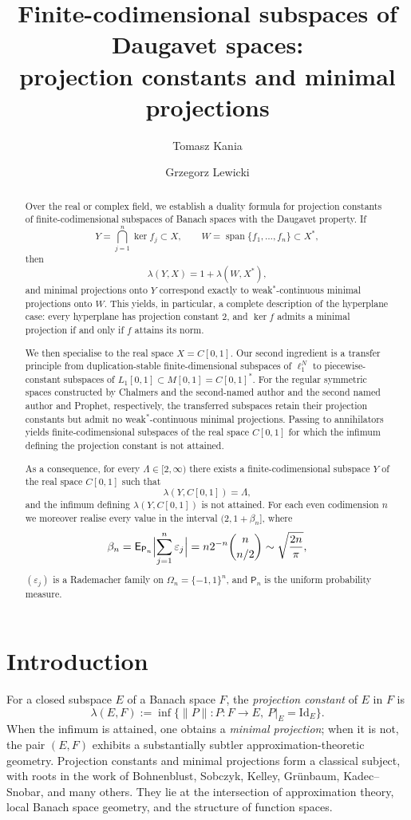 \documentclass[11pt]{amsart}
\title[Finite-codimensional subspaces of Daugavet spaces]
{Finite-codimensional subspaces of Daugavet spaces:\\
projection constants and minimal projections}
\author[T.~Kania]{Tomasz Kania}
\author[G.~Lewicki]{Grzegorz Lewicki}
\numberwithin{equation}{section}
\theoremstyle{definition}
\theoremstyle{remark}
\newcommand{\Id}{\mathrm{Id}}
\newcommand{\Exp}{\mathsf E}
\newcommand{\Prob}{\mathsf P}
\DeclareMathOperator{\spanop}{span}
\begin{document}
\begin{abstract}
Over the real or complex field, we establish a duality formula for projection constants of finite-codimensional subspaces of Banach spaces with the Daugavet property. If
\[
Y=\bigcap_{j=1}^n \ker f_j \subset X,
\qquad
W=\spanop\{f_1,\dots,f_n\} \subset X^*,
\]
then
\[
\lambda(Y,X)=1+\lambda(W,X^*),
\]
and minimal projections onto $Y$ correspond exactly to weak$^*$-continuous minimal projections onto $W$. This yields, in particular, a complete description of the hyperplane case: every hyperplane has projection constant $2$, and $\ker f$ admits a minimal projection if and only if $f$ attains its norm.

We then specialise to the real space $X=C[0,1]$. Our second ingredient is a transfer principle from duplication-stable finite-dimensional subspaces of $\ell_1^N$ to piecewise-constant subspaces of $L_1[0,1]\subset M[0,1]=C[0,1]^*$. For the regular symmetric spaces constructed by Chalmers and the second-named author and the second named author and Prophet, respectively, the transferred subspaces retain their projection constants but admit no weak$^*$-continuous minimal projections. Passing to annihilators yields finite-codimensional subspaces of the real space $C[0,1]$ for which the infimum defining the projection constant is not attained.

As a consequence, for every $\Lambda\in[2,\infty)$ there exists a finite-codimensional subspace $Y$ of the real space $C[0,1]$ such that
\[
\lambda(Y,C[0,1])=\Lambda,
\]
and the infimum defining $\lambda(Y,C[0,1])$ is not attained. For each even codimension $n$ we moreover realise every value in the interval $(2,1+\beta_n]$, where
\[
\beta_n
=
\Exp_{\Prob_n}\Bigl|\sum_{j=1}^n \varepsilon_j\Bigr|
=
n2^{-n}\binom{n}{n/2}
\sim
\sqrt{\frac{2n}{\pi}},
\]
$(\varepsilon_j)$ is a Rademacher family on $\Omega_n=\{-1,1\}^n$, and $\Prob_n$ is the uniform probability measure.
\end{abstract}

\maketitle

\section{Introduction}

For a closed subspace $E$ of a Banach space $F$, the \emph{projection constant} of $E$ in $F$ is
\[
\lambda(E,F):=\inf\{\|P\|: P\colon F\to E,\ P|_E=\Id_E\}.
\]
When the infimum is attained, one obtains a \emph{minimal projection}; when it is not, the pair $(E,F)$ exhibits a substantially subtler approximation-theoretic geometry. Projection constants and minimal projections form a classical subject, with roots in the work of Bohnenblust, Sobczyk, Kelley, Grünbaum, Kadec--Snobar, and many others. They lie at the intersection of approximation theory, local Banach space geometry, and the structure of function spaces. 
\end{document}
